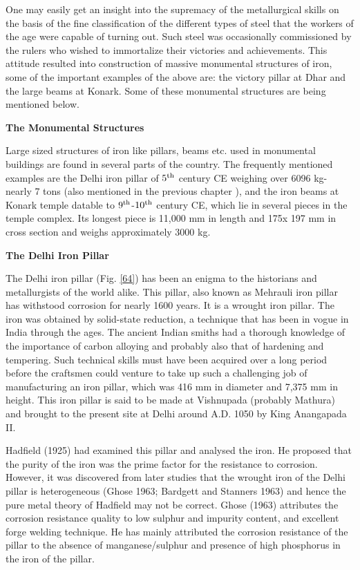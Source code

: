 One may easily get an insight into the supremacy of the metallurgical skills on the basis of the fine classification of the different types of steel that the workers of the age were capable of turning out. Such steel was occasionally commissioned by the rulers who wished to immortalize their victories and achievements. This attitude resulted into construction of massive monumental structures of iron, some of the important examples of the above are: the victory pillar at Dhar and the large beams at Konark. Some of these monumental structures are being mentioned below.	

\noindent \textbf{\large The Monumental Structures}

Large sized structures of iron like pillars, beams etc. used in monumental buildings are found in several parts of the country. The frequently mentioned examples are the Delhi iron pillar of $5^{\rm th}$ century CE weighing over 6096 kg- nearly 7 tons (also mentioned in the previous chapter ), and the iron beams at Konark temple datable to $9^{\rm th}$-$10^{\rm th}$ century CE, which lie in several pieces in the temple complex. Its longest piece is 11,000 mm in length and 175x 197 mm in cross section and weighs approximately 3000 kg.

\noindent \textbf{\large The Delhi Iron Pillar}

The Delhi iron pillar (Fig. \ref{64}) has been an enigma to the historians and metallurgists of the world alike. This pillar, also known as Mehrauli iron pillar has withstood corrosion for nearly 1600 years. It is a wrought iron pillar. The iron was obtained by solid-state reduction, a technique that has been in vogue in India through the ages. The ancient Indian smiths had a thorough knowledge of the importance of carbon alloying and probably also that of hardening and tempering. Such technical skills must have been acquired over a long period before the craftsmen could venture to take up such a challenging job of manufacturing an iron pillar, which was 416 mm in diameter and 7,375 mm in height. This iron pillar is said to be made at Vishnupada (probably Mathura) and brought to the present site at Delhi around A.D. 1050 by King Anangapada II.

Hadfield (1925) had examined this pillar and analysed the iron. He proposed that the purity of the iron was the prime factor for the resistance to corrosion. However, it was discovered from later studies that the wrought iron of the Delhi pillar is heterogeneous (Ghose 1963; Bardgett and Stanners 1963) and hence the pure metal theory of Hadfield may not be correct. Ghose (1963) attributes the corrosion resistance quality to low sulphur and impurity content, and excellent forge welding technique. He has mainly attributed the corrosion resistance of the pillar to the absence of manganese/sulphur and presence of high phosphorus in the iron of the pillar.

